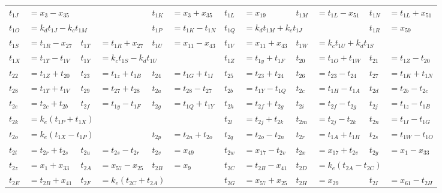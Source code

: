 \begin{tabular}{|p{4.3pt}l|p{4.3pt}l|p{4.3pt}l|p{4.3pt}l|p{4.3pt}l|p{4.3pt}l|}
$t_{1J} $ &\multicolumn{3}{l|}{$= x_3 - x_{35}$} & $t_{1K} $ &$= x_3 + x_{35}$ & $t_{1L} $ &$= x_{19}$ & $t_{1M} $ &$= t_{1L} - x_{51}$ & $t_{1N} $ &$= t_{1L} + x_{51}$\\ 
$t_{1O} $ &\multicolumn{3}{l|}{$= k_dt_{1J} - k_ct_{1M}$} & $t_{1P} $ &$= t_{1K} - t_{1N}$ & $t_{1Q} $ &\multicolumn{3}{l|}{$= k_dt_{1M} + k_ct_{1J}$} & $t_{1R} $ &$= x_{59}$\\ 
$t_{1S} $ &$= t_{1R} - x_{27}$ & $t_{1T} $ &$= t_{1R} + x_{27}$ & $t_{1U} $ &$= x_{11} - x_{43}$ & $t_{1V} $ &$= x_{11} + x_{43}$ & $t_{1W} $ &\multicolumn{3}{l|}{$= k_ct_{1U} + k_dt_{1S}$}\\ 
$t_{1X} $ &$= t_{1T} - t_{1V}$ & $t_{1Y} $ &\multicolumn{3}{l|}{$= k_ct_{1S} - k_dt_{1U}$} & $t_{1Z} $ &$= t_{1y} + t_{1F}$ & $t_{20} $ &$= t_{1O} + t_{1W}$ & $t_{21} $ &$= t_{1Z} - t_{20}$\\ 
$t_{22} $ &$= t_{1Z} + t_{20}$ & $t_{23} $ &$= t_{1z} + t_{1B}$ & $t_{24} $ &$= t_{1G} + t_{1I}$ & $t_{25} $ &$= t_{23} + t_{24}$ & $t_{26} $ &$= t_{23} - t_{24}$ & $t_{27} $ &$= t_{1K} + t_{1N}$\\ 
$t_{28} $ &$= t_{1T} + t_{1V}$ & $t_{29} $ &$= t_{27} + t_{28}$ & $t_{2a} $ &$= t_{28} - t_{27}$ & $t_{2b} $ &$= t_{1Y} - t_{1Q}$ & $t_{2c} $ &$= t_{1H} - t_{1A}$ & $t_{2d} $ &$= t_{2b} - t_{2c}$\\ 
$t_{2e} $ &$= t_{2c} + t_{2b}$ & $t_{2f} $ &$= t_{1y} - t_{1F}$ & $t_{2g} $ &$= t_{1Q} + t_{1Y}$ & $t_{2h} $ &$= t_{2f} + t_{2g}$ & $t_{2i} $ &$= t_{2f} - t_{2g}$ & $t_{2j} $ &$= t_{1z} - t_{1B}$\\ 
$t_{2k} $ &\multicolumn{5}{l|}{$= k_e(t_{1P} + t_{1X})$} & $t_{2l} $ &$= t_{2j} + t_{2k}$ & $t_{2m} $ &$= t_{2j} - t_{2k}$ & $t_{2n} $ &$= t_{1I} - t_{1G}$\\ 
$t_{2o} $ &\multicolumn{3}{l|}{$= k_e(t_{1X} - t_{1P})$} & $t_{2p} $ &$= t_{2n} + t_{2o}$ & $t_{2q} $ &$= t_{2o} - t_{2n}$ & $t_{2r} $ &$= t_{1A} + t_{1H}$ & $t_{2s} $ &$= t_{1W} - t_{1O}$\\ 
$t_{2t} $ &$= t_{2r} + t_{2s}$ & $t_{2u} $ &$= t_{2s} - t_{2r}$ & $t_{2v} $ &$= x_{49}$ & $t_{2w} $ &$= x_{17} - t_{2v}$ & $t_{2x} $ &$= x_{17} + t_{2v}$ & $t_{2y} $ &$= x_1 - x_{33}$\\ 
$t_{2z} $ &$= x_1 + x_{33}$ & $t_{2A} $ &$= x_{57} - x_{25}$ & $t_{2B} $ &$= x_9$ & $t_{2C} $ &$= t_{2B} - x_{41}$ & $t_{2D} $ &\multicolumn{3}{l|}{$= k_e(t_{2A} - t_{2C})$}\\ 
$t_{2E} $ &$= t_{2B} + x_{41}$ & $t_{2F} $ &\multicolumn{3}{l|}{$= k_e(t_{2C} + t_{2A})$} & $t_{2G} $ &$= x_{57} + x_{25}$ & $t_{2H} $ &$= x_{29}$ & $t_{2I} $ &$= x_{61} - t_{2H}$\\ 

\end{tabular}
